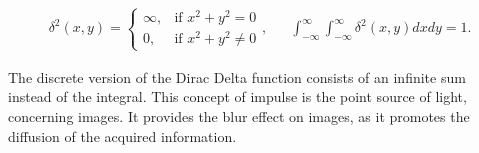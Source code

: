 \begin{align}
\label{eqn:dirac_delta_function}
\delta^{2}(x,y)= 
\begin{cases}
    \infty, & \text{if } x^{2} + y^{2} =0\\
    0, & \text{if } x^{2} + y^{2} \neq 0
\end{cases},
&&
\int_{-\infty}^{\infty}
\int_{-\infty}^{\infty}
\delta^{2}(x,y)dxdy = 1.
\end{align}

\noindent The discrete version of the Dirac Delta function consists of an infinite sum instead of the integral. This concept of impulse is the point source of light, concerning images. It provides the blur effect on images, as it promotes the diffusion of the acquired information.